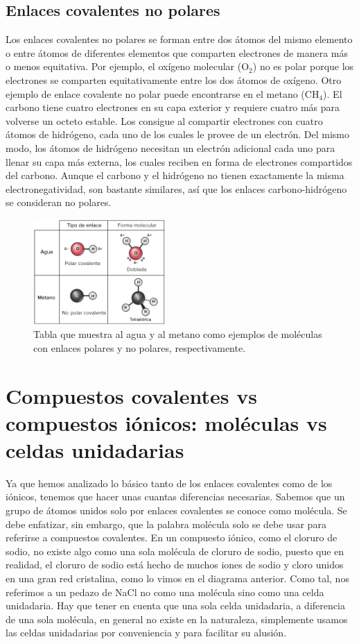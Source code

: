 \subsection{Enlaces covalentes no polares}
Los enlaces covalentes no polares se forman entre dos átomos del mismo elemento o entre átomos de diferentes elementos que comparten electrones de manera más o menos equitativa. Por ejemplo, el oxígeno molecular (O$_2$) no es polar porque los electrones se comparten equitativamente entre los dos átomos de oxígeno.
Otro ejemplo de enlace covalente no polar puede encontrarse en el metano (CH$_4$). El carbono tiene cuatro electrones en su capa exterior y requiere cuatro más para volverse un octeto estable. Los consigue al compartir electrones con cuatro átomos de hidrógeno, cada uno de los cuales le provee de un electrón. Del mismo modo, los átomos de hidrógeno necesitan un electrón adicional cada uno para llenar su capa más externa, los cuales reciben en forma de electrones compartidos del carbono. Aunque el carbono y el hidrógeno no tienen exactamente la misma electronegatividad, son bastante similares, así que los enlaces carbono-hidrógeno se consideran no polares.

\begin{figure}[H]
    \centering
    \includegraphics[width=0.45\textwidth]{../images/e9168870283410c05c4d00f62277a5888614bd6f}
    \caption{Tabla que muestra al agua y al metano como ejemplos de moléculas con enlaces polares y no polares, respectivamente.}
    \label{fig:e9168870283410c05c4d00f62277a5888614bd6f}
\end{figure}


\section{Compuestos covalentes vs compuestos iónicos: moléculas vs celdas unidadarias}
Ya que hemos analizado lo básico tanto de los enlaces covalentes como de los iónicos, tenemos que hacer unas cuantas diferencias necesarias. Sabemos que un grupo de átomos unidos solo por enlaces covalentes se conoce como molécula. Se debe enfatizar, sin embargo, que la palabra molécula solo se debe usar para referirse a compuestos covalentes. En un compuesto iónico, como el cloruro de sodio, no existe algo como una sola molécula de cloruro de sodio, puesto que en realidad, el cloruro de sodio está hecho de muchos iones de sodio y cloro unidos en una gran red cristalina, como lo vimos en el diagrama anterior. Como tal, nos referimos a un pedazo de NaCl no como una molécula sino como una celda unidadaria. Hay que tener en cuenta que una sola celda unidadaria, a diferencia de una sola molécula, en general no existe en la naturaleza, simplemente usamos las celdas unidadarias por conveniencia y para facilitar su alusión.

